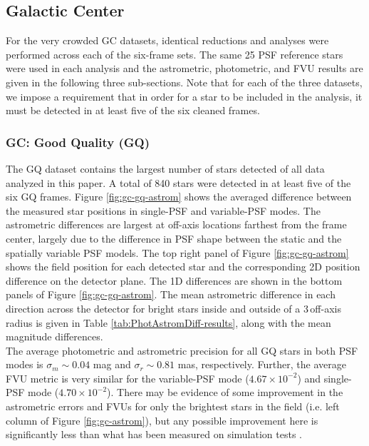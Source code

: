\documentclass[]{spie}  %
\begin{document}
\subsection{Galactic Center} \label{sec:results-gc}

\indent For the very crowded GC datasets, identical reductions and analyses were performed across each of the six-frame sets. The same 25 PSF reference stars were used in each analysis and the astrometric, photometric, and FVU results are given in the following three sub-sections. Note that for each of the three datasets, we impose a requirement that in order for a star to be included in the analysis, it must be detected in at least five of the six cleaned frames.

\subsubsection{GC: Good Quality (GQ)} \label{sec:results-gc-GQ}
\noindent The GQ dataset contains the largest number of stars detected of all data analyzed in this paper. A total of 840 stars were detected in at least five of the six GQ frames. Figure \ref{fig:gc-gq-astrom} shows the averaged difference between the measured star positions in single-PSF and variable-PSF modes. The astrometric differences are largest at off-axis locations farthest from the frame center, largely due to the difference in PSF shape between the static and the spatially variable PSF models. The top right panel of Figure \ref{fig:gc-gq-astrom} shows the field position for each detected star and the corresponding 2D position difference on the detector plane. The 1D differences are shown in the bottom panels of Figure \ref{fig:gc-gq-astrom}. The mean astrometric difference in each direction across the detector for bright stars inside and outside of a 3\textquotesingle\textquotesingle\,off-axis radius is given in Table \ref{tab:PhotAstromDiff-results}, along with the mean magnitude differences.
\\
\indent The average photometric and astrometric precision for all GQ stars in both PSF modes is $\sigma_{{m}}{\sim}0.04$ mag and $\sigma_{{r}}{\sim}0.81$ mas, respectively. Further, the average FVU metric is very similar for the variable-PSF mode ($4.67\times10^{-2}$) and single-PSF mode ($4.70\times10^{-2}$). There may be evidence of some improvement in the astrometric errors and FVUs for only the brightest stars in the field (i.e. left column of Figure \ref{fig:gc-astrom}), but any possible improvement here is significantly less than what has been measured on simulation tests \cite{Turri:inprep}.
\end{document}
